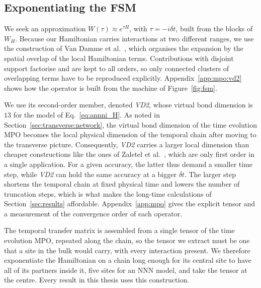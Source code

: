 \subsection{Exponentiating the \texorpdfstring{\ac{FSM}}{FSM}}
\label{sec:mporep:exp}

We seek an approximation $W(\tau)\approx e^{\tau H}$, with $\tau=-i\delta t$, built from the blocks of $W_H$. Because our Hamiltonian carries interactions at two different ranges, we use the construction of Van Damme et al.~\cite{vandamme2024}, which organises the expansion by the spatial overlap of the local Hamiltonian terms. Contributions with disjoint support factorise and are kept to all orders, so only connected clusters of overlapping terms have to be reproduced explicitly. Appendix~\ref{app:mpo:vd2} shows how the operator is built from the machine of Figure~\ref{fig:fsm}.

We use its second-order member, denoted \textit{VD2}, whose virtual bond dimension is $13$ for the model of Eq.~\eqref{eq:annni_H}. As noted in Section~\ref{sec:transverse:network}, the virtual bond dimension of the time evolution \ac{MPO} becomes the local physical dimension of the temporal chain after moving to the transverse picture. Consequently, \textit{VD2} carries a larger local dimension than cheaper constructions like the ones of Zaletel et al.~\cite{zaletel2015}, which are only first order in a single application. For a given accuracy, the latter thus demand a smaller time step, while \textit{VD2} can hold the same accuracy at a bigger $\delta t$. The larger step shortens the temporal chain at fixed physical time and lowers the number of truncation steps, which is what makes the long-time calculations of Section~\ref{sec:results} affordable. Appendix~\ref{app:mpo} gives the explicit tensor and a measurement of the convergence order of each operator.

The temporal transfer matrix is assembled from a single tensor of the time evolution \ac{MPO}, repeated along the chain, so the tensor we extract must be one that a site in the bulk would carry, with every interaction present. We therefore exponentiate the Hamiltonian on a chain long enough for its central site to have all of its partners inside it, five sites for an \ac{NNN} model, and take the tensor at the centre. Every result in this thesis uses this construction.
